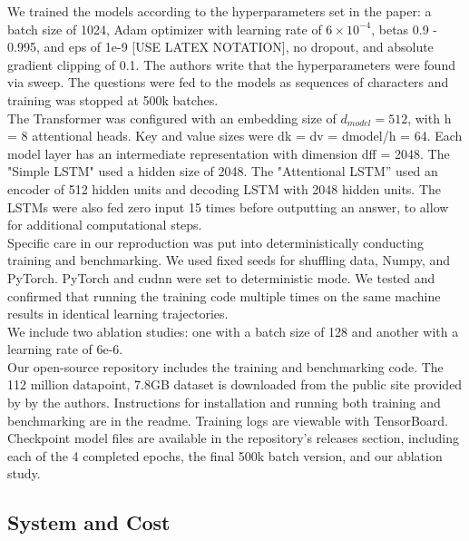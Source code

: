 We trained the models according to the hyperparameters set in the paper: a batch size of 1024, Adam optimizer with learning rate of $6 \times 10^{-4}$, betas 0.9 - 0.995, and eps of 1e-9 [USE LATEX NOTATION], no dropout, and absolute gradient clipping of 0.1. The authors write that the hyperparameters were found via sweep. The questions were fed to the models as sequences of characters and training was stopped at 500k batches.\\

The Transformer was configured with an embedding size of $d_{model} = 512$, with h = 8 attentional heads. Key and value sizes were dk = dv = dmodel/h = 64. Each model layer has an intermediate representation with dimension dff = 2048. The "Simple LSTM" used a hidden size of 2048. The "Attentional LSTM” used an encoder of 512 hidden units and decoding LSTM with 2048 hidden units. The LSTMs were also fed zero input 15 times before outputting an answer, to allow for additional computational steps. \\

Specific care in our reproduction was put into deterministically conducting training and benchmarking. We used fixed seeds for shuffling data, Numpy, and PyTorch. PyTorch and cudnn were set to deterministic mode. We tested and confirmed that running the training code multiple times on the same machine results in identical learning trajectories. \\

We include two ablation studies: one with a batch size of 128 and another with a learning rate of 6e-6. \\

Our open-source repository\supercite{hs-math-nlp} includes the training and benchmarking code. The 112 million datapoint, 7.8GB dataset is downloaded from the public site provided by by the authors\supercite{dataset}. Instructions for installation and running both training and benchmarking are in the readme. Training logs are viewable with TensorBoard\supercite{tensorboard}. Checkpoint model files are available in the repository's releases section, including each of the 4 completed epochs, the final 500k batch version, and our ablation study. \\

\subsection{System and Cost} \\

